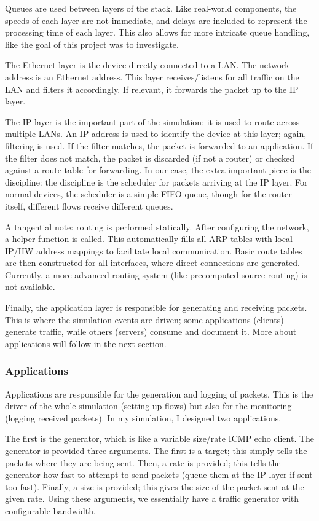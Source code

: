 \documentclass[conference]{IEEEtran}
\begin{document}
Queues are used between layers of the stack.
Like real-world components, the speeds of each layer are not immediate, and delays
are included to represent the processing time of each layer.
This also allows for more intricate queue handling, like the goal of this project was to investigate.

The Ethernet layer is the device directly connected to a LAN.
The network address is an Ethernet address.
This layer receives/listens for all traffic on the LAN and filters it accordingly.
If relevant, it forwards the packet up to the IP layer.

The IP layer is the important part of the simulation; it is used to route across multiple LANs.
An IP address is used to identify the device at this layer; again, filtering is used.
If the filter matches, the packet is forwarded to an application.
If the filter does not match, the packet is discarded (if not a router) or checked against a route table for forwarding.
In our case, the extra important piece is the discipline: the discipline is the scheduler for packets arriving at the IP layer.
For normal devices, the scheduler is a simple FIFO queue, though for the router itself, different flows receive different
queues.

A tangential note: routing is performed statically.
After configuring the network, a helper function is called.
This automatically fills all ARP tables with local IP/HW address mappings to facilitate local communication.
Basic route tables are then constructed for all interfaces, where direct connections are generated.
Currently, a more advanced routing system (like precomputed source routing) is not available.

Finally, the application layer is responsible for generating and receiving packets.
This is where the simulation events are driven; some applications (clients) generate traffic, while others (servers)
consume and document it.
More about applications will follow in the next section.

    \subsubsection{Applications} \label{subsubsec:apps}
Applications are responsible for the generation and logging of packets.
This is the driver of the whole simulation (setting up flows) but also for the monitoring (logging received packets).
In my simulation, I designed two applications.

The first is the generator, which is like a variable size/rate ICMP echo client.
The generator is provided three arguments.
The first is a target; this simply tells the packets where they are being sent.
Then, a rate is provided; this tells the generator how fast to attempt to send packets (queue them at the IP layer if sent too fast).
Finally, a size is provided; this gives the size of the packet sent at the given rate.
Using these arguments, we essentially have a traffic generator with configurable bandwidth.
\end{document}
